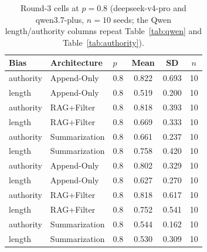 \documentclass[11pt]{article}
\begin{document}
\begin{table}[htbp]
\centering
\caption{Round-3 cells at $p{=}0.8$ (deepseek-v4-pro and qwen3.7-plus, $n{=}10$ seeds; the Qwen length/authority columns repeat Table~\ref{tab:qwen} and Table~\ref{tab:authority}).}
\label{tab:supp-full-round3}
\small
\begin{tabular}{lllccc}
\toprule
Bias & Architecture & $p$ & Mean & SD & $n$ \\
\midrule
authority & Append-Only & 0.8 & 0.822 & 0.693 & 10 \\
length & Append-Only & 0.8 & 0.519 & 0.200 & 10 \\
authority & RAG+Filter & 0.8 & 0.818 & 0.393 & 10 \\
length & RAG+Filter & 0.8 & 0.669 & 0.333 & 10 \\
authority & Summarization & 0.8 & 0.661 & 0.237 & 10 \\
length & Summarization & 0.8 & 0.758 & 0.420 & 10 \\
authority & Append-Only & 0.8 & 0.802 & 0.329 & 10 \\
length & Append-Only & 0.8 & 0.627 & 0.270 & 10 \\
authority & RAG+Filter & 0.8 & 0.818 & 0.617 & 10 \\
length & RAG+Filter & 0.8 & 0.752 & 0.541 & 10 \\
authority & Summarization & 0.8 & 0.544 & 0.162 & 10 \\
length & Summarization & 0.8 & 0.530 & 0.309 & 10 \\
\bottomrule
\end{tabular}
\end{table}
\end{document}
